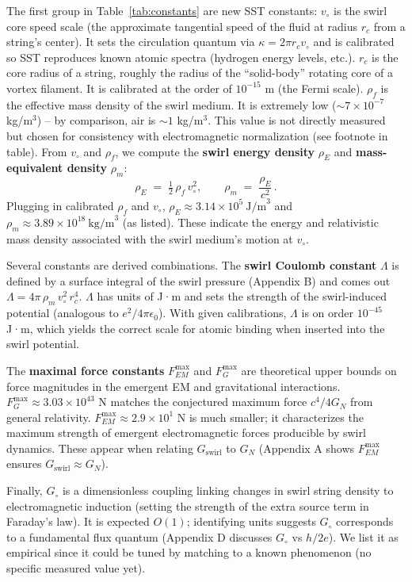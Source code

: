 \documentclass[reprint,aps,onecolumn,nofootinbib]{revtex4-2}
\newcommand{\rhoE}{\rho_{\!E}}                           %
\newcommand{\rhom}{\rho_{\!m}}                           %
\begin{document}
	The first group in Table~\ref{tab:constants} are new SST constants:
	\textbf{$v_{\circ}$} is the swirl core speed scale (the approximate tangential speed of the fluid at radius $r_c$ from a string’s center). It sets the circulation quantum via $\kappa = 2\pi r_c v_{\circ}$ and is calibrated so SST reproduces known atomic spectra (hydrogen energy levels, etc.).
	\textbf{$r_c$} is the core radius of a string, roughly the radius of the “solid-body” rotating core of a vortex filament. It is calibrated at the order of $10^{-15}$ m (the Fermi scale).
	\textbf{$\rho_f$} is the effective mass density of the swirl medium. It is extremely low ($\sim\!7\times10^{-7}$ kg/m$^3$) – by comparison, air is $\sim1$ kg/m$^3$. This value is not directly measured but chosen for consistency with electromagnetic normalization (see footnote in table). From $v_{\circ}$ and $\rho_f$, we compute the \textbf{swirl energy density} $\rhoE$ and \textbf{mass-equivalent density} $\rhom$:
	\[
		\rhoE \;=\; \tfrac{1}{2}\,\rho_f\,v_{\circ}^2, \qquad
		\rhom \;=\; \frac{\rhoE}{c^2}\,.
	\]
	Plugging in calibrated $\rho_f$ and $v_{\circ}$, $\rhoE \approx 3.14\times10^{5}~\text{J/m}^3$ and $\rho_m \approx 3.89\times10^{18}~\text{kg/m}^3$ (as listed). These indicate the energy and relativistic mass density associated with the swirl medium’s motion at $v_{\circ}$.

	Several constants are derived combinations. The \textbf{swirl Coulomb constant} $\Lambda$ is defined by a surface integral of the swirl pressure (Appendix B) and comes out $\Lambda = 4\pi\,\rho_m\,v_{\circ}^2\,r_c^4$. $\Lambda$ has units of J·m and sets the strength of the swirl-induced potential (analogous to $e^2/4\pi\epsilon_0$). With given calibrations, $\Lambda$ is on order $10^{-45}$ J·m, which yields the correct scale for atomic binding when inserted into the swirl potential.

	The \textbf{maximal force constants} $F_{\!EM}^{\max}$ and $F_{\!G}^{\max}$ are theoretical upper bounds on force magnitudes in the emergent EM and gravitational interactions. $F_{\!G}^{\max}\approx3.03\times10^{43}$ N matches the conjectured maximum force $c^4/4G_N$ from general relativity. $F_{\!EM}^{\max}\approx2.9\times10^1$ N is much smaller; it characterizes the maximum strength of emergent electromagnetic forces producible by swirl dynamics. These appear when relating $G_{\text{swirl}}$ to $G_N$ (Appendix A shows $F_{\!EM}^{\max}$ ensures $G_{\text{swirl}}\approx G_N$).

	Finally, $G_{\circ}$ is a dimensionless coupling linking changes in swirl string density to electromagnetic induction (setting the strength of the extra source term in Faraday’s law). It is expected $O(1)$; identifying units suggests $G_{\circ}$ corresponds to a fundamental flux quantum (Appendix D discusses $G_{\circ}$ vs $h/2e$). We list it as empirical since it could be tuned by matching to a known phenomenon (no specific measured value yet).
\end{document}
